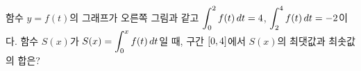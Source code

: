 \noindent\begin{minipage}[t]{0.58\linewidth}\vspace{0pt}\raggedright 함수 $y=f(t)$의 그래프가 오른쪽 그림과 같고 $\displaystyle\int_{0}^{2} f(t)\mkern3mu dt=4$, $\displaystyle\int_{2}^{4} f(t)\mkern3mu dt=-2$이다. 함수 $S(x)$가 $S(x)=\displaystyle\int_{0}^{x} f(t)\mkern3mu dt$일 때, 구간 $[0{,}\mkern3mu\mathopen{}4]$에서 $S(x)$의 최댓값과 최솟값의 합은?\end{minipage}\hfill\begin{minipage}[t]{0.4\linewidth}\vspace{0pt}\centering \resizebox{\ifdim\width>\linewidth\linewidth\else\width\fi}{!}{}\end{minipage}\par
{}
